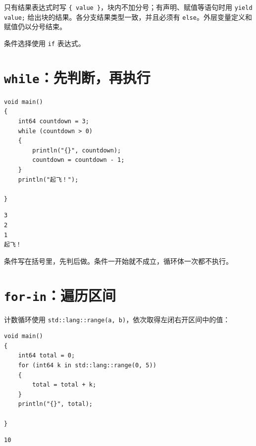 只有结果表达式时写 \texttt{\{ value \}}，块内不加分号；有声明、赋值等语句时用 \texttt{yield value;} 给出块的结果。各分支结果类型一致，并且必须有 \texttt{else}。外层变量定义和赋值仍以分号结束。

条件选择使用 \texttt{if} 表达式。

\section{\texttt{while}：先判断，再执行}

\par
\medskip
\begin{lstlisting}[style=chali]
void main()
{
    int64 countdown = 3;
    while (countdown > 0)
    {
        println("{}", countdown);
        countdown = countdown - 1;
    }
    println("起飞！");

}
\end{lstlisting}
\par
\medskip

\par
\medskip
\begin{lstlisting}[style=out]
3
2
1
起飞！
\end{lstlisting}
\par
\medskip

条件写在括号里，先判后做。条件一开始就不成立，循环体一次都不执行。

\section{\texttt{for-in}：遍历区间}

计数循环使用 \texttt{std:\allowbreak{}:\allowbreak{}lang:\allowbreak{}:\allowbreak{}range(\allowbreak{}a,\allowbreak{} b)\allowbreak{}}，依次取得左闭右开区间中的值：

\par
\medskip
\begin{lstlisting}[style=chali]
void main()
{
    int64 total = 0;
    for (int64 k in std::lang::range(0, 5))
    {
        total = total + k;
    }
    println("{}", total);

}
\end{lstlisting}
\par
\medskip

\par
\medskip
\begin{lstlisting}[style=out]
10
\end{lstlisting}
\par
\medskip

